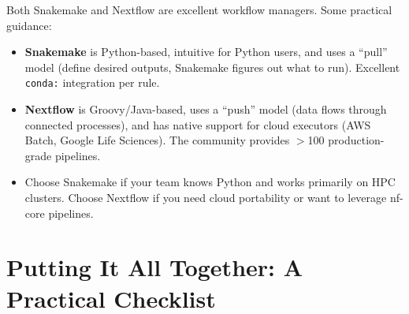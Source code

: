 \begin{tipbox}[title={Nextflow vs Snakemake: Which to Choose?}]
Both Snakemake and Nextflow are excellent workflow managers. Some practical guidance:
\begin{itemize}[nosep]
  \item \textbf{Snakemake} is Python-based, intuitive for Python users, and uses a ``pull'' model (define desired outputs, Snakemake figures out what to run). Excellent \texttt{conda:} integration per rule.
  \item \textbf{Nextflow} is Groovy/Java-based, uses a ``push'' model (data flows through connected processes), and has native support for cloud executors (AWS Batch, Google Life Sciences). The  community provides $>$100 production-grade pipelines.
  \item Choose Snakemake if your team knows Python and works primarily on HPC clusters. Choose Nextflow if you need cloud portability or want to leverage nf-core pipelines.
\end{itemize}
\end{tipbox}

\section{Putting It All Together: A Practical Checklist}
\label{sec:diyanalysis:checklist}

